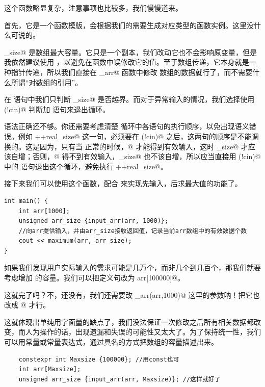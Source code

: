 这个函数略显复杂，注意事项也比较多，我们慢慢道来。\par
首先，它是一个函数模版，会根据我们的需要生成对应类型的函数实例。这里没什么可说的。\par
\lstinline@max_size@ 是数组最大容量。它只是一个副本，我们改动它也不会影响原变量，但是我依然建议使用 \lstinline@const@，以避免在函数中误修改它的值。至于数组传递，它本身就是一种指针传递，所以我们直接在 \lstinline@input_arr@ 函数中修改 \lstinline@arr@ 数组的数据就行了，而不需要什么所谓``对数组的引用''。\par
在 \lstinline@while@ 语句中我们只判断 \lstinline@real_size@ 是否越界。而对于异常输入的情况，我们选择使用 \lstinline@if(!cin)@ 判断加 \lstinline@break@ 语句来退出循环。\par
语法正确还不够。你还需要考虑清楚 \lstinline@while@ 循环中各语句的执行顺序，以免出现语义错误。例如 \lstinline@++real_size@ 这一句，必须要在 \lstinline@if(!cin)@ 之后，这两句的顺序是不能调换的。这是因为，只有当 \lstinline@cin@ 正常的时候，@ 才能得到有效输入，这时 \lstinline@real_size@ 才应该自增；否则，@ 得不到有效输入，\lstinline@real_size@ 也不该自增，所以应当直接用 \lstinline@if(!cin)@ 中的 \lstinline@break@ 语句退出这个循环，避免执行 \lstinline@++real_size@。\par
接下来我们可以使用这个函数，配合 \lstinline@maximum@ 来实现先输入，后求最大值的功能了。\par
\begin{lstlisting}
int main() {
    int arr[1000];
    unsigned arr_size {input_arr(arr, 1000)};
    //向arr提供输入，并由arr_size接收返回值，记录当前arr数组中的有效数据个数
    cout << maximum(arr, arr_size);
}
\end{lstlisting}\par
如果我们发现用户实际输入的需求可能是几万个，而非几个到几百个，那我们就要考虑增加 \lstinline@arr@ 的容量。我们可以把定义句改为 \lstinline@int arr[100000]@。\par
这就完了吗？不，还没有，我们还需要改 \lstinline@input_arr(arr,1000)@ 这里的参数呐！把它也改成 @ 才行。\par
这就体现出单纯用字面量的缺点了，我们没法保证一次修改之后所有相关数据都改变，而人为操作的话，出现遗漏和失误的可能性又太大了。为了保持统一性，我们可以用常量或常量表达式，通过具名的方式把数组的容量描述出来。
\begin{lstlisting}
    constexpr int Maxsize {100000}; //用const也可
    int arr[Maxsize];
    unsigned arr_size {input_arr(arr, Maxsize)}; //这样就好了
\end{lstlisting}
